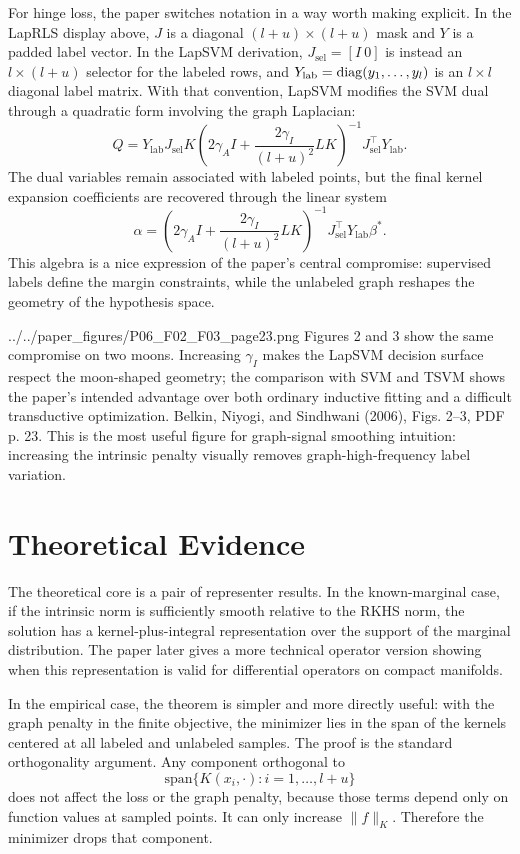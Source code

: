 \documentclass[11pt]{article}
\begin{document}
For hinge loss, the paper switches notation in a way worth making explicit.
In the LapRLS display above, \(J\) is a diagonal \((l+u)\times(l+u)\) mask
and \(Y\) is a padded label vector. In the LapSVM derivation, \(J_{\mathrm{sel}}
= [I\ 0]\) is instead an \(l\times(l+u)\) selector for the labeled rows, and
\(Y_{\mathrm{lab}}=\operatorname{diag}(y_1,\ldots,y_l)\) is an \(l\times l\) diagonal label
matrix. With that convention, LapSVM modifies the SVM dual through a
quadratic form involving the graph Laplacian:
\[
  Q
  =
  Y_{\mathrm{lab}}J_{\mathrm{sel}}K
  \left(
    2\gamma_A I
    +
    \frac{2\gamma_I}{(l+u)^2}LK
  \right)^{-1}
  J_{\mathrm{sel}}^\top Y_{\mathrm{lab}} .
\]
The dual variables remain associated with labeled points, but the final
kernel expansion coefficients are recovered through the linear system
\[
  \alpha
  =
  \left(
    2\gamma_A I
    +
    \frac{2\gamma_I}{(l+u)^2}LK
  \right)^{-1}
  J_{\mathrm{sel}}^\top Y_{\mathrm{lab}}\beta^\ast .
\]
This algebra is a nice expression of the paper's central compromise:
supervised labels define the margin constraints, while the unlabeled graph
reshapes the geometry of the hypothesis space.

\paperfigure
  {../../paper_figures/P06_F02_F03_page23.png}
  {Figures 2 and 3 show the same compromise on two moons.  Increasing
  $\gamma_I$ makes the LapSVM decision surface respect the moon-shaped
  geometry; the comparison with SVM and TSVM shows the paper's intended
  advantage over both ordinary inductive fitting and a difficult
  transductive optimization.}
  {Belkin, Niyogi, and Sindhwani (2006), Figs. 2--3, PDF p. 23.}
  {This is the most useful figure for graph-signal smoothing intuition:
  increasing the intrinsic penalty visually removes graph-high-frequency
  label variation.}

\section{Theoretical Evidence}

The theoretical core is a pair of representer results.  In the known-marginal
case, if the intrinsic norm is sufficiently smooth relative to the RKHS norm,
the solution has a kernel-plus-integral representation over the support of
the marginal distribution.  The paper later gives a more technical operator
version showing when this representation is valid for differential operators
on compact manifolds.

In the empirical case, the theorem is simpler and more directly useful: with
the graph penalty in the finite objective, the minimizer lies in the span of
the kernels centered at all labeled and unlabeled samples.  The proof is the
standard orthogonality argument.  Any component orthogonal to
\[
  \mathrm{span}\{K(x_i,\cdot): i=1,\ldots,l+u\}
\]
does not affect the loss or the graph penalty, because those terms depend
only on function values at sampled points.  It can only increase
$\|f\|_K$.  Therefore the minimizer drops that component.
\end{document}
